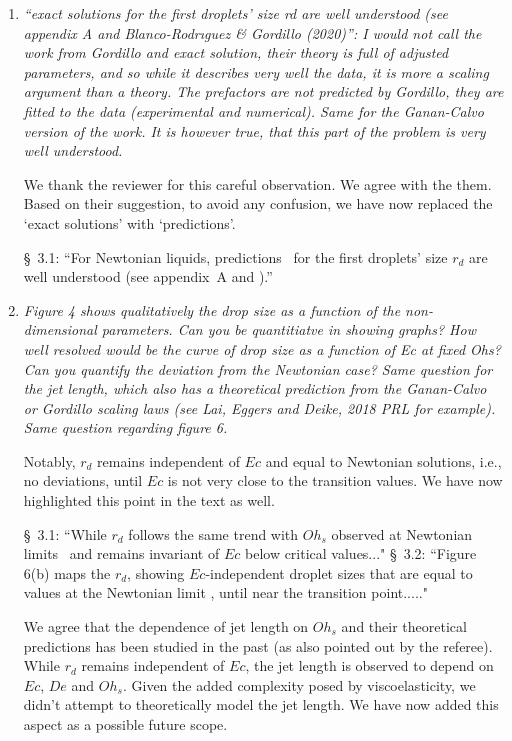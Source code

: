 \documentclass[]{article}
\newcommand{\oo}{\color{magenta} \normalfont}
\newcommand{\bb}{\color{black} \normalfont}
\begin{document}
\begin{enumerate}
      \item \textit{“exact solutions for the first droplets’ size rd are well understood (see appendix A and Blanco-Rodrıguez \& Gordillo (2020)”: I would not call the work from Gordillo and exact solution, their theory is full of adjusted parameters, and so while it describes very well the data, it is more a scaling argument than a theory. The prefactors are not predicted by Gordillo, they are fitted to the data (experimental and numerical). Same for the Ganan-Calvo version of the work. It is however true, that this part of the problem is very well understood.}

      We thank the reviewer for this careful observation. We agree with the them. Based on their suggestion, to avoid any confusion, we have now replaced the `exact solutions' with `predictions'.

      \S~3.1:
      ``For Newtonian liquids, \oo predictions\bb\, for the first droplets' size $r_d$ are well understood (see appendix~A and \cite{ganan2017revision,blanco2020sea}).''

       \item \textit{Figure 4 shows qualitatively the drop size as a function of the non-dimensional parameters. Can you be quantitiatve in showing graphs? How well resolved would be the curve of drop size as a function of Ec at fixed Ohs? Can you quantify the deviation from the Newtonian case? Same question for the jet length, which also has a theoretical prediction from the Ganan-Calvo or Gordillo scaling laws (see Lai, Eggers and Deike, 2018 PRL for example). Same question regarding figure 6.}

       Notably, $r_d$ remains independent of $Ec$ and equal to Newtonian solutions, i.e., no deviations, until $Ec$ is not very close to the transition values. We have now highlighted this point in the text as well.

		\S~3.1:
        ``While $r_d$ follows the same trend with $Oh_s$ \oo observed at Newtonian limits\bb\, and remains invariant of $Ec$ below critical values..."
		\S~3.2:
        ``Figure 6(b) maps the $r_d$, showing $Ec$-independent droplet sizes \oo that are equal to values at the Newtonian limit\bb, until near the transition point....."

        We agree that the dependence of jet length on $Oh_s$ and their theoretical predictions has been studied in the past (as also pointed out by the referee). While $r_d$ remains independent of $Ec$, the jet length is observed to depend on $Ec$, $De$ and $Oh_s$. Given the added complexity posed by viscoelasticity, we didn't attempt to theoretically model the jet length. We have now added this aspect as a possible future scope.


\end{enumerate}
\end{document}
